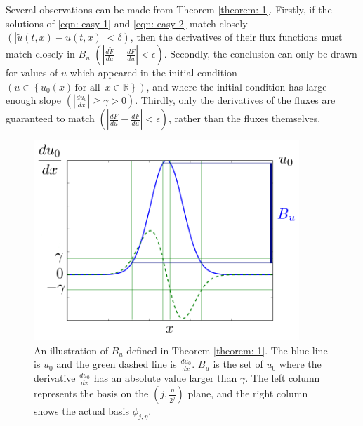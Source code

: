 Several observations can be made from Theorem \ref{theorem: 1}.
Firstly, if the solutions of \eqref{eqn: easy 1} and \eqref{eqn: easy 2} match closely 
$\left(|\tilde{u}(t,x)-u(t,x)| < \delta\right)$, then
the derivatives of their flux functions must match closely in $B_u$ $\left(\left|\frac{d\tilde{F}}{du} - \frac{dF}{du}\right| < 
\epsilon\right)$. 
Secondly, the conclusion 
can only be drawn for values of $u$ which appeared in the initial condition $\left(u\in \left\{u_0(x)\, \textrm{for all } \, x\in \mathbb{R}\right\}\right)$, 
and where the initial condition has large enough slope $\left(\left|\frac{du_0}{dx}\right|\ge \gamma > 0\right)$.
Thirdly, only the derivatives of the fluxes are guaranteed to match $\left(\left|\frac{d\tilde{F}}{du} - \frac{dF}{du}\right| < \epsilon\right)$,
rather than the fluxes themselves. 

\begin{figure}[htbp]
    \begin{center}
        \includegraphics[width=10cm]{../excitedDomain.png}
        \caption{An illustration of $B_u$ defined in Theorem \ref{theorem: 1}. The blue line is $u_0$ 
        and the green dashed line is $\frac{du_0}{dx}$. $B_u$ is the set of $u_0$ where the derivative 
        $\frac{du_0}{dx}$ has an absolute value larger than $\gamma$.
        The left column represents the basis on the $\left(j, \frac{\eta}{2^j}\right)$ plane,
        and the right column shows the actual basis $\phi_{j,\eta}$.}
        \label{fig: excitedDomain}
    \end{center}
\end{figure}

